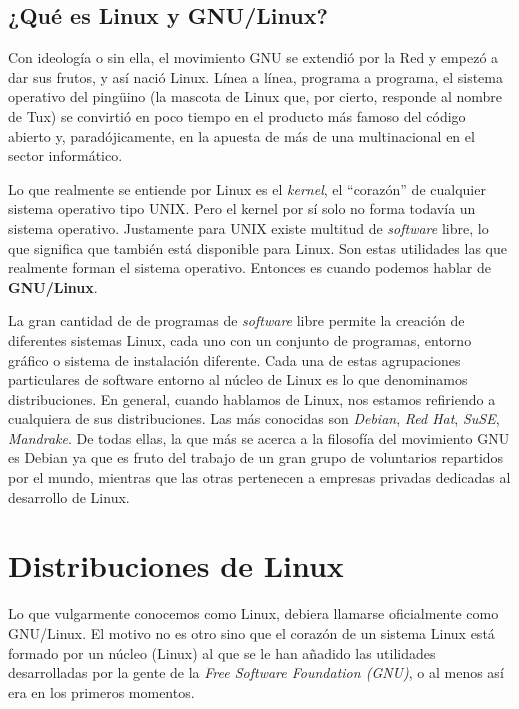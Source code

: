 \subsection{¿Qué es Linux y GNU/Linux?}

Con ideología o sin  ella, el movimiento GNU se extendió  por la Red y
empezó a dar sus frutos, y así  nació Linux. Línea a línea, programa a
programa, el sistema operativo del  pingüino (la mascota de Linux que,
por cierto, responde al nombre de  Tux) se convirtió en poco tiempo en
el producto  más famoso del  código abierto y, paradójicamente,  en la
apuesta de más de una multinacional en el sector informático.

Lo   que    realmente   se   entiende    por   Linux   es    el   {\em
kernel}, el  ``corazón'' de cualquier  sistema operativo
tipo UNIX.  Pero el  kernel por  sí solo no  forma todavía  un sistema
operativo.  Justamente para  UNIX  existe multitud  de {\em  software}
libre, lo  que significa que  también está disponible para  Linux. Son
estas  utilidades  las  que  realmente forman  el  sistema  operativo.
Entonces es cuando podemos hablar de {\bf GNU/Linux}.

La gran  cantidad de de programas  de {\em software} libre  permite la
creación de  diferentes sistemas  Linux, cada uno  con un  conjunto de
programas, entorno  gráfico o  sistema de instalación  diferente. Cada
una de estas  agrupaciones particulares de software  entorno al núcleo
de  Linux es  lo que  denominamos distribuciones.  En general,  cuando
hablamos  de  Linux,  nos  estamos  refiriendo  a  cualquiera  de  sus
distribuciones. Las  más conocidas  son {\em  Debian}, {\em  Red Hat},
{\em SuSE}, {\em Mandrake}. De todas ellas,  la que más se acerca a la
filosofía del movimiento GNU es Debian  ya que es fruto del trabajo de
un gran grupo de voluntarios repartidos por el mundo, mientras que las
otras pertenecen a empresas privadas dedicadas al desarrollo de Linux.

\section{Distribuciones de Linux}

Lo que vulgarmente conocemos como Linux, debiera llamarse oficialmente
como GNU/Linux. El motivo no es otro sino que el corazón de un sistema
Linux está formado por un núcleo (Linux)  al que se le han añadido las
utilidades  desarrolladas  por  la  gente de  la  {\em  Free  Software
Foundation (GNU)}, o al menos así era en los primeros momentos.

